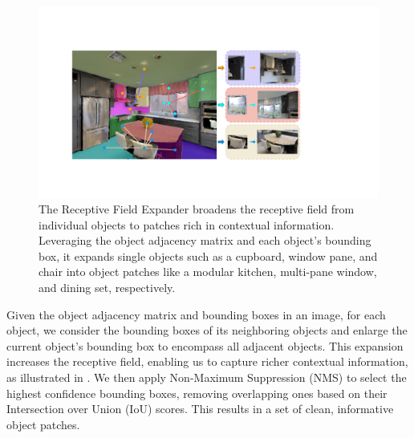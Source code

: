\vspace{-10pt}
\begin{figure}[ht]
    \centering
    \includegraphics[width=\columnwidth]{expander.pdf}
    \vspace{-20pt}
    \caption{The Receptive Field Expander broadens the receptive field from individual objects to patches rich in contextual information. Leveraging the object adjacency matrix and each object's bounding box, it expands single objects such as a cupboard, window pane, and chair into object patches like a modular kitchen, multi-pane window, and dining set, respectively.}
    \vspace{-5pt}
    \label{fig:expander_image}
\end{figure}


Given the object adjacency matrix and bounding boxes in an image, for each object, we consider the bounding boxes of its neighboring objects and enlarge the current object's bounding box to encompass all adjacent objects. This expansion increases the receptive field, enabling us to capture richer contextual information, as illustrated in . We then apply Non-Maximum Suppression (NMS) to select the highest confidence bounding boxes, removing overlapping ones based on their Intersection over Union (IoU) scores. This results in a set of clean, informative object patches.

